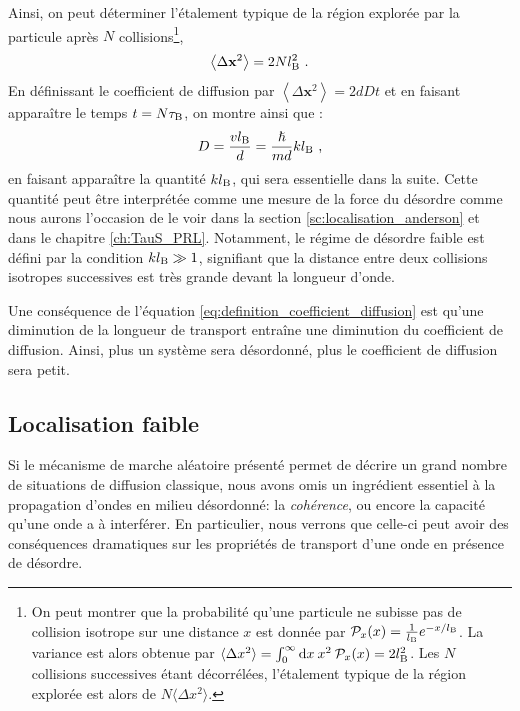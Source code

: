 Ainsi, on peut déterminer l'étalement typique de la région explorée par la particule après $N$ collisions\footnote{On peut montrer que la probabilité qu'une particule ne subisse pas de collision isotrope sur une distance $x$ est donnée par $\mathcal{P}_x(x)=\frac{1}{l_{\mathrm{B}}} e^{-x/l_{\mathrm{B}}}$. La variance est alors obtenue par $\langle\Delta x^2 \rangle = \int_0^\infty{\mathop{}\mathopen{}\mathrm{d}x \: x^2 \:  \mathcal{P}_x(x)}=2l_{\mathrm{B}}^2 $. Les $N$ collisions successives étant décorrélées, l'étalement typique de la région explorée est alors de $N \langle\Delta x^2 \rangle$.},
\begin{equation}
\left\langle \Delta \mathbf{x}^2 \right\rangle=2 N l_{\mathrm{B}}^2 \text{ .}
\end{equation}
En définissant le coefficient de diffusion par $ \left\langle \Delta \mathbf{x}^2 \right\rangle = 2 d D t$ et en faisant apparaître le temps $t=N \tau_{\mathrm{B}}$, on montre ainsi que \citep{akkermans2007mesoscopic}:
\begin{equation}
D=\frac{v l_{\mathrm{B}}}{d}=\frac{\hslash}{m d} k l_{\mathrm{B}} \text{ ,}
\label{eq:definition_coefficient_diffusion}
\end{equation}
en faisant apparaître la quantité $k l_{\mathrm{B}}$, qui sera essentielle dans la suite. Cette quantité peut être interprétée comme une mesure de la force du désordre comme nous aurons l'occasion de le voir dans la section \ref{sc:localisation_anderson} et dans le chapitre \ref{ch:TauS_PRL}. Notamment, le régime de désordre faible est défini par la condition $kl_{\mathrm{B}}\gg 1$, signifiant que la distance entre deux collisions isotropes successives est très grande devant la longueur d'onde.

Une conséquence de l'équation \ref{eq:definition_coefficient_diffusion} est qu'une diminution de la longueur de transport entraîne une diminution du coefficient de diffusion. Ainsi, plus un système sera désordonné, plus le coefficient de diffusion sera petit.














\subsection{Localisation faible}
\label{sc:weak_localisation}
Si le mécanisme de marche aléatoire présenté permet de décrire un grand nombre de situations de diffusion classique, nous avons omis un ingrédient essentiel à la propagation d'ondes en milieu désordonné: la \emph{cohérence}, ou encore la capacité qu'une onde a à interférer. En particulier, nous verrons que celle-ci peut avoir des conséquences dramatiques sur les propriétés de transport d'une onde en présence de désordre.

